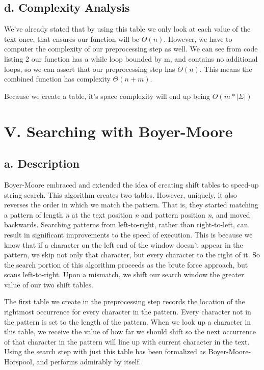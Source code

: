 \documentclass{chi2005}
\begin{document}
\subsection{d. Complexity Analysis }

We've already stated that by using this table we only look at each value of the text once, that ensures our function will be $\Theta(n)$. However, we have to computer the complexity of our preprocessing step as well. We can see from code listing 2 our function has a while loop bounded by m, and contains no additional loops, so we can assert that our preprocessing step has $\Theta(n)$. This means the combined function has complexity $\Theta(n+m)$.

Because we create a table, it's space complexity will end up being $O(m*|\Sigma|)$

\section{V. Searching with Boyer-Moore}

\subsection{a. Description}

Boyer-Moore\cite{BM} embraced and extended the idea of creating shift tables to speed-up string search. This algorithm creates two tables. However, uniquely, it also reverses the order in which we match the pattern. That is, they started matching a pattern of length \emph{n} at the text position \emph{n} and pattern position \emph{n}, and moved backwards. Searching patterns from left-to-right, rather than right-to-left, can result in significant improvements to the speed of execution. This is because we know that if a character on the left end of the window doesn't appear in the pattern, we skip not only that character, but every character to the right of it. So the search portion of this algorithm proceeds as the brute force approach, but scans left-to-right. Upon a mismatch, we shift our search window the greater value of our two shift tables.

The first table we create in the preprocessing step records the location of the rightmost occurrence for every character in the pattern. Every character not in the pattern is set to the length of the pattern. When we look up a character in this table, we receive the value of how far we should shift so the next occurrence of that character in the pattern will line up with current character in the text. Using the search step with just this table has been formalized as  Boyer-Moore-Horspool, and performs admirably by itself.
\end{document}
